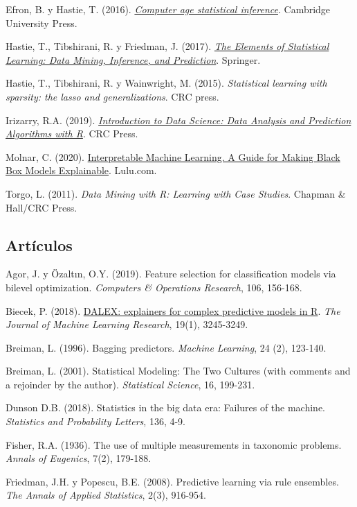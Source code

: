 \documentclass[]{book}
\theoremstyle{break}
\theoremstyle{definition}
\theoremstyle{definition}
\theoremstyle{definition}
\theoremstyle{remark}
\begin{document}
Efron, B. y Hastie, T. (2016).
\emph{\href{http://web.stanford.edu/~hastie/CASI/}{Computer age
statistical inference}}. Cambridge University Press.

Hastie, T., Tibshirani, R. y Friedman, J. (2017).
\emph{\href{https://web.stanford.edu/~hastie/ElemStatLearn}{The Elements
of Statistical Learning: Data Mining, Inference, and Prediction}}.
Springer.

Hastie, T., Tibshirani, R. y Wainwright, M. (2015). \emph{Statistical
learning with sparsity: the lasso and generalizations}. CRC press.

Irizarry, R.A. (2019).
\emph{\href{https://rafalab.github.io/dsbook}{Introduction to Data
Science: Data Analysis and Prediction Algorithms with R}}. CRC Press.

Molnar, C. (2020).
\href{https://christophm.github.io/interpretable-ml-book}{Interpretable
Machine Learning. A Guide for Making Black Box Models Explainable}.
Lulu.com.

Torgo, L. (2011). \emph{Data Mining with R: Learning with Case Studies}.
Chapman \& Hall/CRC Press.

\subsection*{Artículos}\label{artuxedculos}

Agor, J. y Özaltın, O.Y. (2019). Feature selection for classification
models via bilevel optimization. \emph{Computers \& Operations
Research}, 106, 156-168.

Biecek, P. (2018).
\href{http://www.jmlr.org/papers/volume19/18-416/18-416.pdf}{DALEX:
explainers for complex predictive models in R}. \emph{The Journal of
Machine Learning Research}, 19(1), 3245-3249.

Breiman, L. (1996). Bagging predictors. \emph{Machine Learning}, 24 (2),
123-140.

Breiman, L. (2001). Statistical Modeling: The Two Cultures (with
comments and a rejoinder by the author). \emph{Statistical Science}, 16,
199-231.

Dunson D.B. (2018). Statistics in the big data era: Failures of the
machine. \emph{Statistics and Probability Letters}, 136, 4-9.

Fisher, R.A. (1936). The use of multiple measurements in taxonomic
problems. \emph{Annals of Eugenics}, 7(2), 179-188.

Friedman, J.H. y Popescu, B.E. (2008). Predictive learning via rule
ensembles. \emph{The Annals of Applied Statistics}, 2(3), 916-954.
\end{document}
